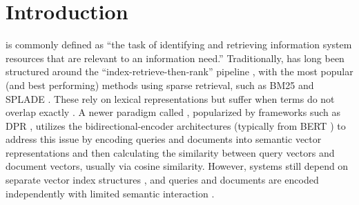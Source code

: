 \section{Introduction}

 is commonly defined as ``the task of identifying and retrieving information system resources that are relevant to an information need.'' Traditionally,  has long been structured around the ``index-retrieve-then-rank'' pipeline \cite{tang-recent-advances,metzler-rethinking-search}, with the most popular (and best performing) methods using sparse retrieval, such as BM25 \cite{robertson-the-probabilistic} and SPLADE \cite{formal-splade-sparse}. These rely on lexical representations but suffer when terms do not overlap exactly \cite{choi-spade-improving,biplob-biswas-efficient-and,luyu-gao-coil-revisit}. A newer paradigm called , popularized by frameworks such as DPR \cite{vladimir-karpukhin-dense-passage}, utilizes the bidirectional-encoder architectures (typically from BERT \cite{devlin-bert-pretraining}) to address this issue by encoding queries and documents into semantic vector representations and then calculating the similarity between query vectors and document vectors, usually via cosine similarity. However,  systems still depend on separate vector index structures \cite{lee-xiong-approximate-nearest,haitao-li-constructing-treebased}, and queries and documents are encoded independently with limited semantic interaction \cite{jianmo-ni-large-dual}.

